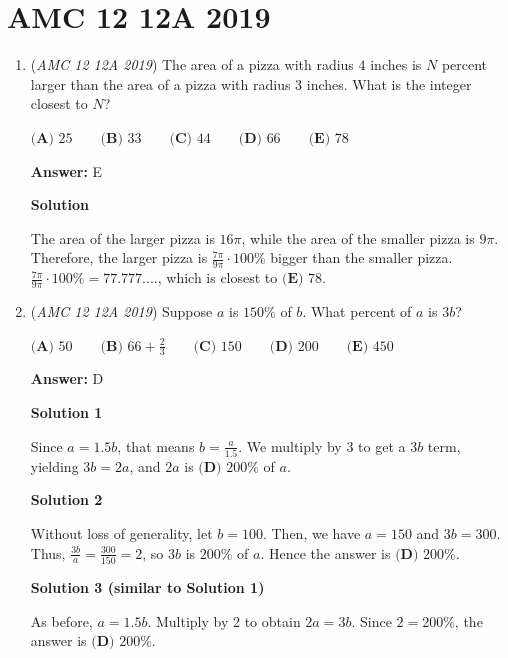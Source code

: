 \section{AMC 12 12A 2019}
        \begin{enumerate}
        	\item (\textit{AMC 12 12A 2019}) The area of a pizza with radius $4$ inches is $N$ percent larger than the area of a pizza with radius $3$ inches. What is the integer closest to $N$?


 $\textbf{(A) } 25 \qquad\textbf{(B) } 33 \qquad\textbf{(C) } 44\qquad\textbf{(D) } 66 \qquad\textbf{(E) } 78$

 \textbf{Answer: }E



\textbf{Solution}

The area of the larger pizza is $16\pi$, while the area of the smaller pizza is $9\pi$. Therefore, the larger pizza is $\frac{7\pi}{9\pi} \cdot 100\%$ bigger than the smaller pizza. $\frac{7\pi}{9\pi} \cdot 100\% = 77.777....$, which is closest to $\boxed{\textbf{(E) }78}$.

 


	\item (\textit{AMC 12 12A 2019}) Suppose $a$ is $150\%$ of $b$. What percent of $a$ is $3b$?


 $\textbf{(A) } 50 \qquad \textbf{(B) } 66+\frac{2}{3} \qquad \textbf{(C) } 150 \qquad \textbf{(D) } 200 \qquad \textbf{(E) } 450$

 \textbf{Answer: }D



\textbf{Solution 1}

Since $a=1.5b$, that means $b=\frac{a}{1.5}$. We multiply by $3$ to get a $3b$ term, yielding $3b=2a$, and $2a$ is $\boxed{\textbf{(D) }200\%}$ of $a$.

 



\textbf{Solution 2}

Without loss of generality, let $b=100$. Then, we have $a=150$ and $3b=300$. Thus, $\frac{3b}{a}=\frac{300}{150}=2$, so $3b$ is $200\%$ of $a$. Hence the answer is $\boxed{\textbf{(D) }200\%}$.

 



\textbf{Solution 3 (similar to Solution 1)}

As before, $a = 1.5b$. Multiply by 2 to obtain $2a = 3b$. Since $2 = 200\%$, the answer is $\boxed{\textbf{(D) }200\%}$.


\end{enumerate}
